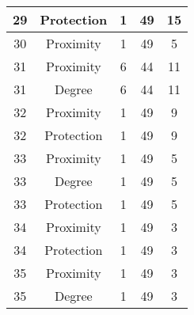 \documentclass[results.tex]{subfiles}
\begin{document}
\begin{center}
\begin{tabular}{| c || c | c | c | c |}
            \hline
            29                      & Protection                   & 1                      & 49                      & 15                   \\
            \hline
            30                      & Proximity                    & 1                      & 49                      & 5                    \\
            \hline
            31                      & Proximity                    & 6                      & 44                      & 11                   \\
            \hline
            31                      & Degree                       & 6                      & 44                      & 11                   \\
            \hline
            32                      & Proximity                    & 1                      & 49                      & 9                    \\
            \hline
            32                      & Protection                   & 1                      & 49                      & 9                    \\
            \hline
            33                      & Proximity                    & 1                      & 49                      & 5                    \\
            \hline
            33                      & Degree                       & 1                      & 49                      & 5                    \\
            \hline
            33                      & Protection                   & 1                      & 49                      & 5                    \\
            \hline
            34                      & Proximity                    & 1                      & 49                      & 3                    \\
            \hline
            34                      & Protection                   & 1                      & 49                      & 3                    \\
            \hline
            35                      & Proximity                    & 1                      & 49                      & 3                    \\
            \hline
            35                      & Degree                       & 1                      & 49                      & 3                    \\

\end{tabular}
\end{center}
\end{document}
